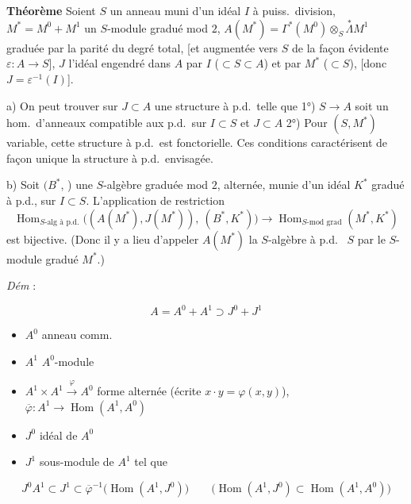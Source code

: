 \documentclass[11pt,a4paper]{article}
\begin{document}

\textbf{Théorème} Soient $S$ un anneau muni d'un idéal $I$ à puiss.\ division,  $M^* = M^0 + M^1$ un $S$-module gradué mod $2$, $A(M^*) = \Gamma^*(M^0) \otimes_S \overset{*}{\Lambda} M^1$  graduée par la parité du degré total, [et augmentée vers $S$ de la façon évidente $\varepsilon : A \to S$], $J$ l'idéal engendré dans $A$ par $I$ ($\subset S \subset A$) et par $M^*$ ($\subset S$), [donc $J = \varepsilon^{-1}(I)$].

a) On peut trouver sur  $J \subset A$ une structure à p.d.\ telle que 1°) $S \to A$ soit un hom.\ d'anneaux compatible aux p.d.\ sur $I \subset S$ et $J \subset A$ 2°) Pour $(S, M^*)$ variable, cette structure à p.d.\ est fonctorielle. Ces conditions caractérisent de façon unique la structure à p.d.\ envisagée.

b) Soit $(B^*$, ) une $S$-algèbre graduée mod $2$,  alternée, munie d'un idéal $K^*$ gradué à p.d.,   sur $I \subset S$. L'application de restriction
\[
  \operatorname{Hom}_{S\text{-alg à p.d.}}\bigl( (A(M^*), J(M^*)),\ (B^*, K^*) \bigr)
  \longrightarrow \operatorname{Hom}_{S\text{-mod grad}}(M^*, K^*)
\]
est bijective. (Donc il y a lieu d'appeler $A(M^*)$ la $S$-algèbre  à p.d.\  $S$  par le $S$-module gradué $M^*$.)

\emph{Dém} :

\[
  A = A^0 + A^1 \supset J^0 + J^1
\]
\begin{itemize}
  \item $A^0$ anneau comm.
  \item $A^1$ $A^0$-module
  \item $A^1 \times A^1 \xrightarrow{\varphi} A^0$ forme alternée (écrite $x \cdot y = \varphi(x, y)$), \quad $\overline{\varphi} : A^1 \to \operatorname{Hom}(A^1, A^0)$
  \item $J^0$ idéal de $A^0$
  \item $J^1$ \struck{\ill{}} sous-module de $A^1$ tel que
\end{itemize}
\[
  J^0 A^1 \subset J^1 \subset \overline{\varphi}^{-1}\bigl( \operatorname{Hom}(A^1, J^0) \bigr)
  \qquad \bigl(\operatorname{Hom}(A^1, J^0) \subset \operatorname{Hom}(A^1, A^0)\bigr)
\]
\end{document}
